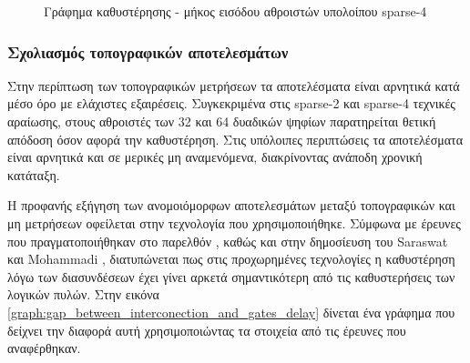 \begin{figure}[H]


\begin{center}
\end{center}
\caption{Γράφημα καθυστέρησης - μήκος εισόδου αθροιστών υπολοίπου sparse-4}   
\label{graph:non-topo-sparse-4}
\end{figure}





\subsubsection{Σχολιασμός τοπογραφικών αποτελεσμάτων}
Στην περίπτωση των τοπογραφικών μετρήσεων τα αποτελέσματα είναι αρνητικά κατά μέσο όρο με ελάχιστες εξαιρέσεις. Συγκεκριμένα στις sparse-2 και sparse-4 τεχνικές αραίωσης, στους αθροιστές των 32 και 64 δυαδικών ψηφίων παρατηρείται θετική απόδοση όσον αφορά την καθυστέρηση. Στις υπόλοιπες περιπτώσεις τα αποτελέσματα είναι αρνητικά και σε μερικές μη αναμενόμενα, διακρίνοντας ανάποδη χρονική κατάταξη. 

Η προφανής εξήγηση των ανομοιόμορφων αποτελεσμάτων μεταξύ τοπογραφικών και μη μετρήσεων οφείλεται στην τεχνολογία που χρησιμοποιήθηκε. Σύμφωνα με έρευνες που πραγματοποιήθηκαν στο παρελθόν \cite{electronics6040078}, καθώς και στην δημοσίευση του Saraswat και Mohammadi \cite{1051729}, διατυπώνεται πως στις προχωρημένες τεχνολογίες η καθυστέρηση λόγω των διασυνδέσεων έχει γίνει αρκετά σημαντικότερη από τις καθυστερήσεις των λογικών πυλών. Στην εικόνα \ref{graph:gap_between_interconection_and_gates_delay} δίνεται ένα γράφημα που δείχνει την διαφορά αυτή χρησιμοποιώντας τα στοιχεία από τις έρευνες που αναφέρθηκαν.

